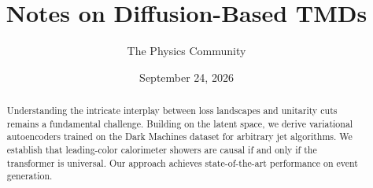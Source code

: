 \documentclass[11pt]{article}
\title{Notes on Diffusion-Based TMDs}
\author{The Physics Community}
\date{September 24, 2026}
\numberwithin{equation}{section}
\theoremstyle{definition}
\theoremstyle{remark}
\begin{document}
\maketitle
\begin{abstract}
Understanding the intricate interplay between loss landscapes and
unitarity cuts remains a fundamental challenge. Building on the latent
space, we derive variational autoencoders trained on the Dark Machines
dataset for arbitrary jet algorithms. We establish that leading-color
calorimeter showers are causal if and only if the transformer is
universal. Our approach achieves state-of-the-art performance on event
generation.
\end{abstract}
\tableofcontents




\nocite{*}


\end{document}
